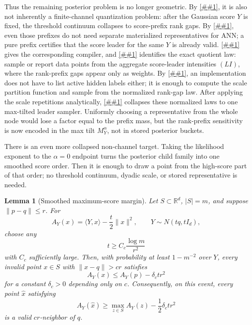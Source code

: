 \documentclass[10pt]{article}
\newcommand{\cref}[1]{\ref{##1}}
\newcommand{\Cref}[1]{\ref{##1}}
\newtheorem{lemma}[theorem]{Lemma}
\theoremstyle{definition}
\newcommand{\R}{\mathbb{R}}
\newcommand{\ip}[2]{\langle #1,#2\rangle}
\begin{document}
Thus the remaining posterior problem is no longer geometric. By \cref{lem:likelihood-rank-prefix}, it is also not inherently a finite-channel quantization problem: after the Gaussian score \(Y\) is fixed, the threshold continuum collapses to score-prefix rank gaps. By \cref{cor:likelihood-prefix-leader}, even those prefixes do not need separate materialized representatives for ANN; a pure prefix certifies that the score leader for the same \(Y\) is already valid. \Cref{lem:dyadic-leader-quotient} gives the corresponding compiler, and \cref{cor:likelihood-leader-intensity} identifies the exact quotient law: sample or report data points from the aggregate score-leader intensities \((LI)\), where the rank-prefix gaps appear only as weights. By \cref{lem:poissonized-normalized-leader-sampler}, an implementation does not have to list active hidden labels either; it is enough to compute the scale partition function and sample from the normalized rank-gap law. After applying the scale repetitions analytically, \cref{lem:scale-amplified-alpha-leader} collapses these normalized laws to one max-tilted leader sampler. Uniformly choosing a representative from the whole node would lose a factor equal to the prefix mass, but the rank-prefix sensitivity is now encoded in the max tilt \(M_Y^\alpha\), not in stored posterior buckets.

There is an even more collapsed non-channel target. Taking the likelihood exponent to the $\alpha=0$ endpoint turns the posterior child family into one smoothed score order. Then it is enough to draw a point from the high-score part of that order; no threshold continuum, dyadic scale, or stored representative is needed.

\begin{lemma}[Smoothed maximum-score margin]\label{lem:smoothed-max-score-margin}
   Let $S\subset\R^d$, $|S|=m$, and suppose $\|p-q\|\le r$. For
   \[
      A_Y(x)=\ip{Y}{x}-\frac t2\|x\|^2,
      \qquad
      Y\sim N(tq,tI_d),
   \]
   choose any
   \[
      t\ge C_c\frac{\log m}{r^2}
   \]
   with $C_c$ sufficiently large. Then, with probability at least
   $1-m^{-2}$ over $Y$, every invalid point $x\in S$ with
   $\|x-q\|>cr$ satisfies
   \[
      A_Y(x)\le A_Y(p)-\delta_c t r^2
   \]
   for a constant $\delta_c>0$ depending only on $c$. Consequently, on this
   event, every point $\widehat x$ satisfying
   \[
      A_Y(\widehat x)\ge\max_{z\in S}A_Y(z)-\frac12\delta_c t r^2
   \]
   is a valid $cr$-neighbor of $q$.
\end{lemma}
\end{document}
